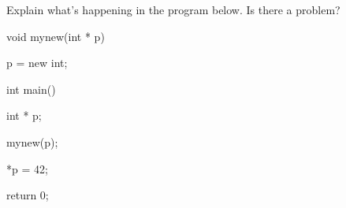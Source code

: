 Explain what's happening in the program below. Is there a problem?



\begin{consolethree}[escapeinside=||]

void mynew(int * p)

{

    p = new int;

}



int main()

{

    int * p;

    mynew(p);

    *p = 42;

    return 0;

}

\end{consolethree}

